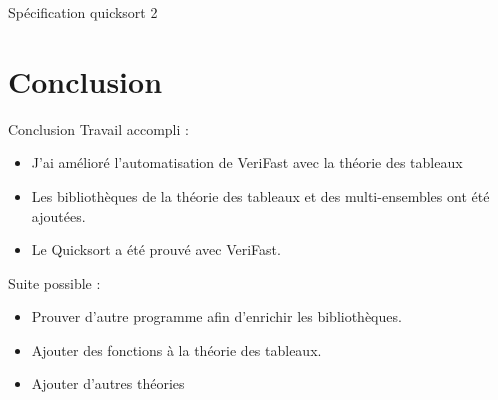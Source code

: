 \documentclass[]{beamer}
\newcommand{\verifast}{VeriFast}
\begin{document}
\begin{frame}[fragile]{Sp\'ecification quicksort 2}

\end{frame}

\section{Conclusion}

\begin{frame}
\tableofcontents[currentsection]
\end{frame}

\begin{frame}{Conclusion}
Travail accompli :
\begin{itemize}
\item J'ai am\'elior\'e l'automatisation de \verifast{} avec la th\'eorie des tableaux
\item Les biblioth\`eques de la th\'eorie des tableaux et des multi-ensembles ont \'et\'e ajout\'ees.
\item Le Quicksort a \'et\'e prouv\'e avec \verifast.
\end{itemize}

Suite possible :
\begin{itemize}
\item Prouver d'autre programme afin d'enrichir les biblioth\`eques.
\item Ajouter des fonctions \`a la th\'eorie des tableaux.
\item Ajouter d'autres th\'eories
\end{itemize}
\end{frame}
\end{document}
